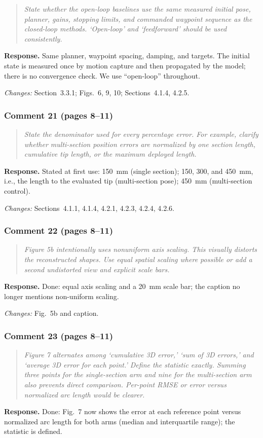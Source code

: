 \documentclass[11pt,a4paper]{article}
\newcommand{\rc}[1]{\begin{quote}\color{black!70}\itshape #1\end{quote}}
\begin{document}
\rc{State whether the open-loop baselines use the same measured initial pose, planner, gains, stopping limits, and commanded waypoint sequence as the closed-loop methods. `Open-loop' and `feedforward' should be used consistently.}
\textbf{Response.} Same planner, waypoint spacing, damping, and targets. The initial state is measured once by motion capture and then propagated by the model; there is no convergence check. We use ``open-loop'' throughout.

\textit{Changes:} Section~3.3.1; Figs.~6, 9, 10; Sections~4.1.4, 4.2.5.

\subsubsection*{Comment 21 (pages 8--11)}

\rc{State the denominator used for every percentage error. For example, clarify whether multi-section position errors are normalized by one section length, cumulative tip length, or the maximum deployed length.}
\textbf{Response.} Stated at first use: 150~mm (single section); 150, 300, and 450~mm, i.e., the length to the evaluated tip (multi-section pose); 450~mm (multi-section control).

\textit{Changes:} Sections~4.1.1, 4.1.4, 4.2.1, 4.2.3, 4.2.4, 4.2.6.

\subsubsection*{Comment 22 (pages 8--11)}

\rc{Figure 5b intentionally uses nonuniform axis scaling. This visually distorts the reconstructed shapes. Use equal spatial scaling where possible or add a second undistorted view and explicit scale bars.}
\textbf{Response.} Done: equal axis scaling and a 20~mm scale bar; the caption no longer mentions non-uniform scaling.

\textit{Changes:} Fig.~5b and caption.

\subsubsection*{Comment 23 (pages 8--11)}

\rc{Figure 7 alternates among `cumulative 3D error,' `sum of 3D errors,' and `average 3D error for each point.' Define the statistic exactly. Summing three points for the single-section arm and nine for the multi-section arm also prevents direct comparison. Per-point RMSE or error versus normalized arc length would be clearer.}
\textbf{Response.} Done: Fig.~7 now shows the error at each reference point versus normalized arc length for both arms (median and interquartile range); the statistic is defined.
\end{document}
